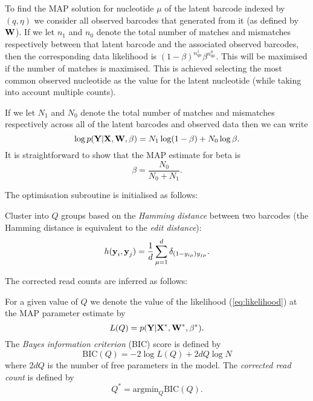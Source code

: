 \begin{footnotesize}
To find the MAP solution for nucleotide $\mu$ of the latent barcode indexed by $(q,\eta)$ we consider all observed barcodes that generated from it (as defined by $\boldsymbol{\mathbf{W}}$). If we let $n_1$ and $n_0$ denote the total number of matches and mismatches respectively between that latent barcode and the associated observed barcodes, then the corresponding data likelihood is $(1-\beta)^{n^1_{q\mu}}\beta^{n^0_{q\mu}}$. This will be maximised if the number of matches is maximised. This is achieved selecting the most common observed nucleotide as the value for the latent nucleotide (while taking into account multiple counts).

If we let $N_1$ and $N_0$ denote the total number of matches and mismatches respectively across all of the latent barcodes and observed data then we can write 
\begin{equation}
\log p(\boldsymbol{\mathbf{Y}}|\boldsymbol{\mathbf{X}},\boldsymbol{\mathbf{W}},\beta) = N_1 \log(1-\beta) + N_0\log\beta.
\end{equation}
It is straightforward to show that the MAP estimate for beta is
\begin{equation}
\beta = \frac{N_0}{N_0+N_1}.
\end{equation}


The optimisation subroutine is initialised as follows:

Cluster into $Q$ groups based on the \emph{Hamming distance} between two barcodes (the Hamming distance is equivalent to the \emph{edit distance}):
\begin{equation}
h(\boldsymbol{\mathbf{y}}_i,\boldsymbol{\mathbf{y}}_j) = \frac{1}{d}\sum_{\mu=1}^{d}\delta_{(1-y_{i\mu})y_{j\mu}}.
\end{equation}


The corrected read counts are inferred as follows:

For a given value of $Q$ we denote the value of the likelihood (\ref{eq:likelihood}) at the MAP parameter estimate by
\begin{equation}
L(Q) = p(\boldsymbol{\mathbf{Y}}|\boldsymbol{\mathbf{X}}^*,\boldsymbol{\mathbf{W}}^*,\beta^*).
\end{equation}
The \emph{Bayes information criterion} (BIC) score is defined by
\begin{equation}
\text{BIC}(Q) = -2\log L(Q) + 2dQ\log N
\end{equation}
where $2dQ$ is the number of free parameters in the model. The \emph{corrected read count} is defined by
\begin{equation}
Q^* = \text{argmin}_Q \text{BIC}(Q).
\end{equation}



\end{footnotesize}
